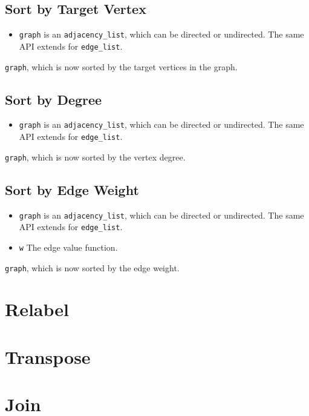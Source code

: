 \subsection{Sort by Target Vertex}
{\small
      
}
\begin{itemdescr}
    \pnum\preconditions
    \begin{itemize}
          \item
                \lstinline{graph} is an \lstinline{adjacency_list}, which can be directed or undirected. The same API extends for \lstinline{edge_list}.
    \end{itemize}
    \pnum\effects \lstinline{graph}, which is now sorted by the target vertices in the graph.
\end{itemdescr}

\subsection{Sort by Degree}
{\small
      
}
\begin{itemdescr}
    \pnum\preconditions
    \begin{itemize}
          \item
                \lstinline{graph} is an \lstinline{adjacency_list}, which can be directed or undirected. The same API extends for \lstinline{edge_list}.
    \end{itemize}
    \pnum\effects \lstinline{graph}, which is now sorted by the vertex degree.
\end{itemdescr}

\subsection{Sort by Edge Weight}
{\small
      
}
\begin{itemdescr}
    \pnum\preconditions
    \begin{itemize}
          \item
                \lstinline{graph} is an \lstinline{adjacency_list}, which can be directed or undirected. The same API extends for \lstinline{edge_list}.
          \item
                \lstinline{w} The edge value function.
    \end{itemize}
    \pnum\effects \lstinline{graph}, which is now sorted by the edge weight.
\end{itemdescr}

\section{Relabel}
\section{Transpose}
\section{Join}